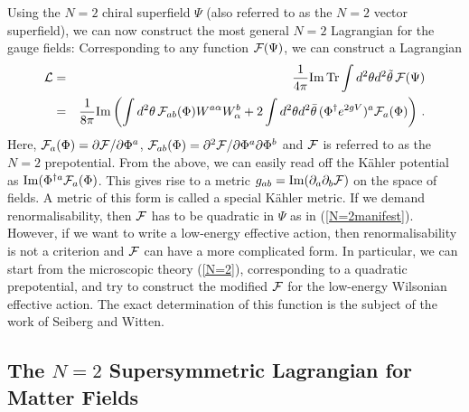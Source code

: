 Using the $N=2$ chiral superfield $\Psi$ (also referred to as the
$N=2$ vector superfield), we can now construct the most general
$N=2$ Lagrangian for the gauge fields: Corresponding to any function
${\cal F}(\Psi)$, we can construct a Lagrangian  
\begin{eqnarray}
{\cal L}&=& \frac{1}{4\pi}{\rm Im\,Tr}\int d^2\theta d^2\tilde\theta
\,{\cal F}(\Psi) 
\nonumber\\
&=&\frac{1}{8\pi}{\rm Im}\left(\int d^2\theta\, {\cal F}_{ab}(\Phi) 
W^{a\alpha}W^b_\alpha + 2\int d^2\theta d^2\bar\theta\, (\Phi^\dagger 
e^{2gV})^a {\cal F}_a(\Phi)\right)\,. 
\label{N=2general}
\end{eqnarray}
Here, ${\cal F}_a(\Phi)=\partial{\cal F}/\partial\Phi^a$,
${\cal F}_{ab}(\Phi)=\partial^2{\cal F}/\partial\Phi^a\partial\Phi^b$
and ${\cal F}$ is referred to as the $N=2$ prepotential. From the
above, we can easily read off the K\"{a}hler potential as
${\rm Im}(\Phi^{\dagger a} {\cal F}_a(\Phi)$. This gives rise to a metric 
$g_{ab}={\rm Im}(\partial_a\partial_b{\cal F})$ on the space of fields. 
A metric of this form is called a special K\"{a}hler metric.
If we demand renormalisability, then ${\cal F}$ has to be quadratic in
$\Psi$ as in (\ref{N=2manifest}). However, if we want to write a
low-energy effective action, then renormalisability is not a criterion
and ${\cal F}$ can have a more complicated form. In particular, we can
start from the microscopic theory (\ref{N=2}), corresponding to a
quadratic prepotential, and try to construct the modified ${\cal F}$
for the low-energy Wilsonian effective action. The exact determination
of this function is the subject of the work of Seiberg and Witten.

\subsection{The $N=2$ Supersymmetric Lagrangian for Matter Fields}

